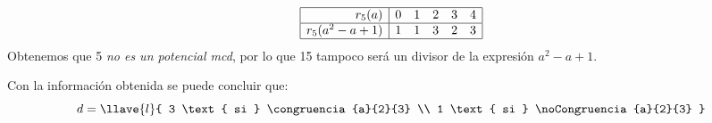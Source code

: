 $$
  \begin{array}{|r|ccccc|}
    \hline
    r_5(a)           & 0 & 1 & 2 & 3 & 4 \\ \hline
    r_5(a^2 - a + 1) & 1 & 1 & 3 & 2 & 3 \\ \hline
  \end{array}
$$
Obtenemos que 5 \textit{no es un potencial mcd}, por lo que 15 tampoco será un divisor de la expresión  $a^2 - a + 1$.

Con la información obtenida se puede concluir que:
$$
  d =
  \llave{l}{
    3 \text{ si } \congruencia{a}{2}{3} \\
    1 \text{ si } \noCongruencia{a}{2}{3}
  }
$$

\begin{aportes}
  \item {}
  \item {}
\end{aportes}
